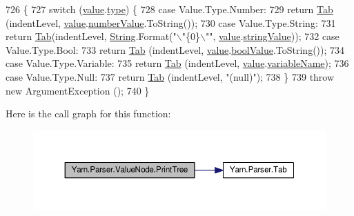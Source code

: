 \begin{DoxyCode}
726             \{
727                 \textcolor{keywordflow}{switch} (\hyperlink{a00178_a51ab5939344f9bfa21181c02cf0e341d}{value}.\hyperlink{a00177_a6d5820fafa766911b9da84d1ed33e51a}{type}) \{
728                 \textcolor{keywordflow}{case} Value.Type.Number:
729                     \textcolor{keywordflow}{return} \hyperlink{a00139_aa8fa36b46de12a1c561d77b99c4b9ae3}{Tab} (indentLevel, \hyperlink{a00178_a51ab5939344f9bfa21181c02cf0e341d}{value}.\hyperlink{a00177_ae1892c1c7a8177537d1caa39a2e51da6}{numberValue}.ToString());
730                 \textcolor{keywordflow}{case} Value.Type.String:
731                     \textcolor{keywordflow}{return} \hyperlink{a00139_aa8fa36b46de12a1c561d77b99c4b9ae3}{Tab}(indentLevel, \hyperlink{a00041_a301aa7c866593a5b625a8fc158bbeacea27118326006d3829667a400ad23d5d98}{String}.Format(\textcolor{stringliteral}{"\(\backslash\)"\{0\}\(\backslash\)""}, 
      \hyperlink{a00178_a51ab5939344f9bfa21181c02cf0e341d}{value}.\hyperlink{a00177_add1b07146f1a9e4b655b33c93d07dff9}{stringValue}));
732                 \textcolor{keywordflow}{case} Value.Type.Bool:
733                     \textcolor{keywordflow}{return} \hyperlink{a00139_aa8fa36b46de12a1c561d77b99c4b9ae3}{Tab} (indentLevel, \hyperlink{a00178_a51ab5939344f9bfa21181c02cf0e341d}{value}.\hyperlink{a00177_acb140e3466e132528409d4c441fd67da}{boolValue}.ToString());
734                 \textcolor{keywordflow}{case} Value.Type.Variable:
735                     \textcolor{keywordflow}{return} \hyperlink{a00139_aa8fa36b46de12a1c561d77b99c4b9ae3}{Tab} (indentLevel, \hyperlink{a00178_a51ab5939344f9bfa21181c02cf0e341d}{value}.\hyperlink{a00177_a8ee2b09b7d28eaf97bf63c74d0023bfd}{variableName});
736                 \textcolor{keywordflow}{case} Value.Type.Null:
737                     \textcolor{keywordflow}{return} \hyperlink{a00139_aa8fa36b46de12a1c561d77b99c4b9ae3}{Tab} (indentLevel, \textcolor{stringliteral}{"(null)"});
738                 \}
739                 \textcolor{keywordflow}{throw} \textcolor{keyword}{new} ArgumentException ();
740             \}
\end{DoxyCode}


Here is the call graph for this function\-:
\nopagebreak
\begin{figure}[H]
\begin{center}
\leavevmode
\includegraphics[width=350pt]{a00178_ae4659e4431e9846a45e0d048c960781a_cgraph}
\end{center}
\end{figure}


